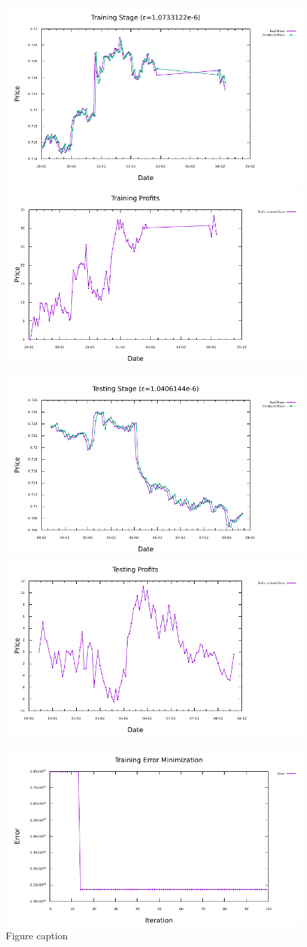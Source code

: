 \begin{figure}[htp]
\centering


\includegraphics[width=.45\textwidth]{img/plots/aud_usd_h1-10agents-10rules-20ind-100gen_training_fit.pdf}\quad
\includegraphics[width=.45\textwidth]{img/plots/aud_usd_h1-10agents-10rules-20ind-100gen_training_profits.pdf}

\medskip

\includegraphics[width=.45\textwidth]{img/plots/aud_usd_h1-10agents-10rules-20ind-100gen_testing_fit.pdf}\quad
\includegraphics[width=.45\textwidth]{img/plots/aud_usd_h1-10agents-10rules-20ind-100gen_testing_profits.pdf}

\medskip

\includegraphics[width=.45\textwidth]{img/plots/aud_usd_h1-10agents-10rules-20ind-100gen_error_minimization.pdf}

\caption{Figure caption}
\label{pics:blablabla}
\end{figure}

